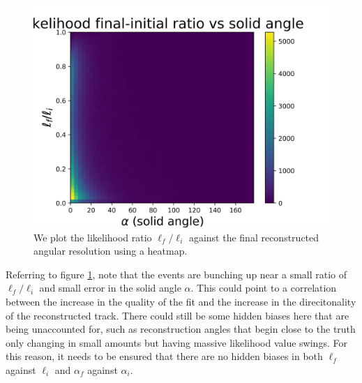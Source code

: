 \begin{figure}[H]
  \centering
  \includegraphics[width=12cm]{./Figures/reco_plots/alpha_dist_vs_llhratio_heat.png}
  \caption{We plot the likelihood ratio $\ell_{f}/\ell_{i}$ against the final reconstructed angular resolution using a heatmap. }
  \label{fig:alpha_llhratio_comp}
\end{figure}

Referring to figure \ref{fig:alpha_llhratio_comp}, note that the events are bunching up near a small ratio of $\ell_{f}/\ell_{i}$ and small error in the solid angle $\alpha$. This could point to a correlation between the increase in the quality of the fit and the increase in the direcitonality of the reconstructed track. There could still be some hidden biases here that are being unaccounted for, such as reconstruction angles that begin close to the truth only changing in small amounts but having massive likelihood value swings. For this reason, it needs to be ensured that there are no hidden biases in both $\ell_{f}$ against $\ell_{i}$ and $\alpha_{f}$ against $\alpha_{i}$.


